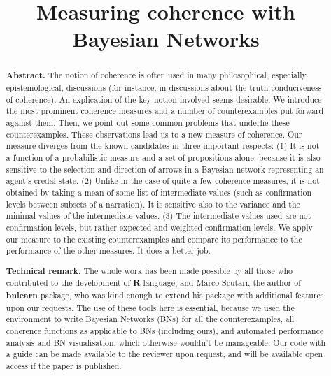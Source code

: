 \documentclass[10pt,]{scrartcl}
\title{Measuring coherence with Bayesian Networks}
\author{}
\date{\vspace{-2.5em}}
\begin{document}
\maketitle

\begin{abstract} \textbf{Abstract.} The notion of coherence is often used in many philosophical, especially epistemological, discussions (for instance, in discussions  about the  truth-conduciveness of coherence). An explication of the key notion involved seems desirable.  We introduce the most prominent coherence measures and a number of counterexamples put forward against them.  Then, we point out some common problems that underlie these counterexamples. These observations lead  us to a new measure of coherence. Our measure  diverges from the known candidates in three important respects: (1) It is not a function of a probabilistic measure and a set of propositions alone, because it is also sensitive to the selection and direction of arrows in a Bayesian network representing an agent's credal state. (2) Unlike in the case of quite a few coherence measures, it is not obtained by taking a mean of some list of intermediate values (such as confirmation levels between subsets of a narration). It  is sensitive also to the variance and the minimal values of the intermediate values. (3) The intermediate values used are not confirmation levels, but rather expected and weighted confirmation levels. We apply our measure to the existing counterexamples and compare its performance to the performance of the other measures. It does a  better job. 


\vspace{3mm}

\footnotesize

\noindent \textbf{Technical remark.} The whole work has been made possible by all those who contributed to the development of \textsf{\textbf{R}} language, and Marco Scutari, the author of \textsf{\textbf{bnlearn}} package, who was kind enough to extend his package with additional features upon our requests. The use of these tools here is essential, because we used the environment to write Bayesian Networks (BNs) for all the counterexamples, all coherence functions as applicable to BNs (including ours), and automated  performance analysis and BN visualisation, which otherwise wouldn't  be manageable. Our code with a guide can be made available to the reviewer upon request, and will be available open access if the paper is published.



\end{abstract}
\end{document}
